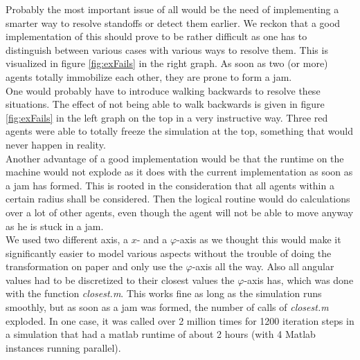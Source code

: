 \noi Probably the most important issue of all would be the need of implementing a smarter way to resolve standoffs or detect them earlier. We reckon that a good implementation of this should prove to be rather difficult as one has to distinguish between various cases with various ways to resolve them. This is visualized in figure \ref{fig:exFails} in the right graph. As soon as two (or more) agents totally immobilize each other, they are prone to form a jam.\\
One would probably have to introduce walking backwards to resolve these situations. The effect of not being able to walk backwards is given in figure \ref{fig:exFails} in the left graph on the top in a very instructive way. Three red agents were able to totally freeze the simulation at the top, something that would never happen in reality.\\
Another advantage of a good implementation would be that the runtime on the machine would not explode as it does with the current implementation as soon as a jam has formed. This is rooted in the consideration that all agents within a certain radius shall be considered. Then the logical routine would do calculations over a lot of other agents, even though the agent will not be able to move anyway as he is stuck in a jam.\\

\noi We used two different axis, a $x$- and a $\varphi$-axis as we thought this would make it significantly easier to model various aspects without the trouble of doing the transformation on paper and only use the $\varphi$-axis all the way. Also all angular values had to be discretized to their closest values the $\varphi$-axis has, which was done with the function \textit{closest.m}. This works fine as long as the simulation runs smoothly, but as soon as a jam was formed, the number of calls of \textit{closest.m} exploded. In one case, it was called over 2 million times for 1200 iteration steps in a simulation that had a matlab runtime of about 2 hours (with 4 Matlab instances running parallel).\\

